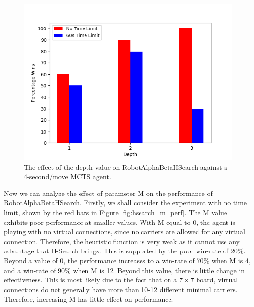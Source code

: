 \begin{figure}
    \centering
    \includegraphics[scale = 0.6]{images/HSEARCHDEPTH_PERF.png}
    \caption{The effect of the depth value on RobotAlphaBetaHSearch against a 4-second/move MCTS agent.}
    \label{fig:hsearch_depth_perf}
\end{figure}
















Now we can analyze the effect of parameter M on the performance of RobotAlphaBetaHSearch. Firstly, we shall consider the experiment with no time limit, shown by the red bars in Figure \ref{fig:hsearch_m_perf}. The M value exhibits poor performance at smaller values. With M equal to 0, the agent is playing with no virtual connections, since no carriers are allowed for any virtual connection. Therefore, the heuristic function is very weak as it cannot use any advantage that H-Search brings. This is supported by the poor win-rate of 20\%. Beyond a value of 0, the performance increases to a win-rate of 70\% when M is 4, and a win-rate of 90\% when M is 12. Beyond this value, there is little change in effectiveness. This is most likely due to the fact that on a $7\times7$ board, virtual connections do not generally have more than 10-12 different minimal carriers. Therefore, increasing M has little effect on performance. 

